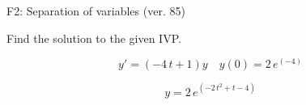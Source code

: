 \begin{exercise}
  \begin{exerciseTitle}F2: Separation of variables (ver. 85)\end{exerciseTitle}
  \begin{exerciseStatement}
    
Find the solution to the given IVP.

    
\[y'=( -4 \, t + 1 )y\hspace{1em} y(0)= 2 \, e^{\left(-4\right)}\]

  \end{exerciseStatement}
  \begin{exerciseAnswer}
    
\[y= 2 \, e^{\left(-2 \, t^{2} + t - 4\right)}\]

  \end{exerciseAnswer}
\end{exercise}